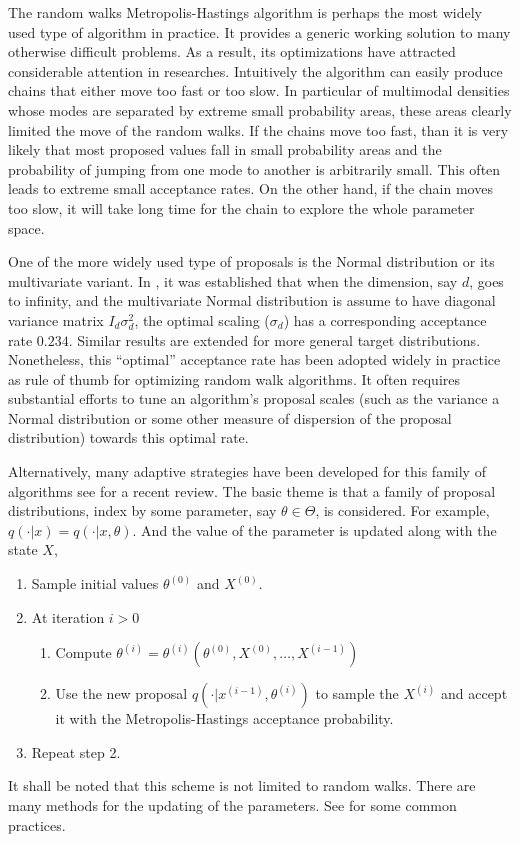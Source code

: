 The random walks Metropolis-Hastings algorithm is perhaps the most widely used
type of \mcmc algorithm in practice. It provides a generic working solution to
many otherwise difficult problems. As a result, its optimizations have
attracted considerable attention in researches. Intuitively the algorithm can
easily produce chains that either move too fast or too slow. In particular of
multimodal densities whose modes are separated by extreme small probability
areas, these areas clearly limited the move of the random walks. If the chains
move too fast, than it is very likely that most proposed values fall in small
probability areas and the probability of jumping from one mode to another is
arbitrarily small. This often leads to extreme small acceptance rates. On the
other hand, if the chain moves too slow, it will take long time for the chain
to explore the whole parameter space.

One of the more widely used type of proposals is the Normal distribution or
its multivariate variant. In \cite{Roberts:2001ta}, it was established that
when the dimension, say $d$, goes to infinity, and the multivariate Normal
distribution is assume to have diagonal variance matrix $I_d\sigma_d^2$, the
optimal scaling ($\sigma_d$) has a corresponding acceptance rate $0.234$.
Similar results are extended for more general target distributions.
Nonetheless, this ``optimal'' acceptance rate has been adopted widely in
practice as rule of thumb for optimizing random walk algorithms. It often
requires substantial efforts to tune an algorithm's proposal scales (such as
the variance a Normal distribution or some other measure of dispersion of the
proposal distribution) towards this optimal rate.

Alternatively, many adaptive strategies have been developed for this family of
algorithms see \cite{Andrieu:2008kh} for a recent review. The basic theme is
that a family of proposal distributions, index by some parameter, say
$\theta\in\Theta$, is considered. For example, $q(\cdot|x) = q(\cdot|x,
\theta)$. And the value of the parameter is updated along with the state $X$,
\begin{enumerate}
  \item Sample initial values $\theta^{(0)}$ and $X^{(0)}$.
  \item At iteration $i > 0$
    \begin{enumerate}
      \item Compute $\theta^{(i)} =
        \theta^{(i)}(\theta^{(0)},X^{(0)},\dots,X^{(i-1)})$
      \item Use the new proposal $q(\cdot|x^{(i-1)},\theta^{(i)})$ to sample
        the $X^{(i)}$ and accept it with the Metropolis-Hastings acceptance
        probability.
    \end{enumerate}
  \item Repeat step 2.
\end{enumerate}
It shall be noted that this scheme is not limited to random walks. There are
many methods for the updating of the parameters. See \cite{Andrieu:2008kh} for
some common practices.


